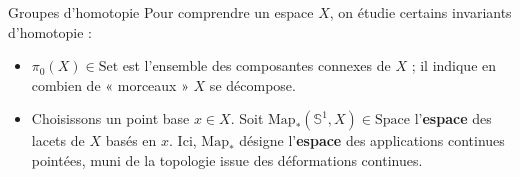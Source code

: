 \documentclass[12pt]{beamer}
\begin{document}
\begin{frame}{Groupes d’homotopie}
Pour comprendre un espace $X$, on étudie certains invariants d’homotopie :
\pause
\begin{itemize}
  \item $\pi_0(X) \in \mathrm{Set}$ est l’ensemble des composantes connexes de $X$ ; il indique en combien de « morceaux » $X$ se décompose. 
    \pause
  \item Choisissons un point base $x\in X$. Soit $\mathrm{Map}_*(\mathbb{S}^1,X)\in \mathrm{Space}$ l’\textbf{espace} des lacets de $X$ basés en $x$. Ici, $\mathrm{Map}_*$ désigne l’\textbf{espace} des applications continues pointées, muni de la topologie issue des déformations continues. 
\end{itemize}
\end{frame}
\end{document}
